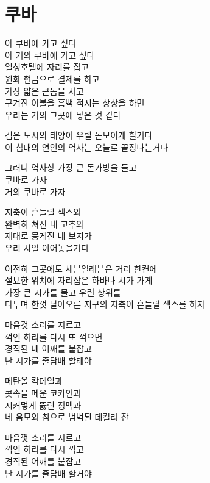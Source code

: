 \begin{article}
\hypertarget{uxcfe0uxbc14}{%
\chapter{쿠바}\label{uxcfe0uxbc14}}

아 쿠바에 가고 싶다\\
아 거의 쿠바에 가고 싶다\\
일성호텔에 자리를 잡고\\
원화 현금으로 결제를 하고\\
가장 얇은 콘돔을 사고\\
구겨진 이불을 흠뻑 적시는 상상을 하면\\
우리는 거의 그곳에 닿은 것 같다

검은 도시의 태양이 우릴 돋보이게 할거다\\
이 침대의 연인의 역사는 오늘로 끝장나는거다

그러니 역사상 가장 큰 돈가방을 들고\\
쿠바로 가자\\
거의 쿠바로 가자

지축이 흔들릴 섹스와\\
완벽히 쳐진 내 고추와\\
제대로 뭉게진 네 보지가\\
우리 사일 이어놓을거다

여전히 그곳에도 세븐일레븐은 거리 한켠에\\
절묘한 위치에 자리잡은 하바나 시가 가게\\
가장 큰 시가를 물고 우린 상위를\\
다투며 한껏 달아오른 지구의 지축이 흔들릴 섹스를 하자

마음것 소리를 지르고\\
꺽인 허리를 다시 또 꺽으면\\
경직된 네 어깨를 붙잡고\\
난 시가를 줄담배 할테야

메탄올 칵테일과\\
콧속을 메운 코카인과\\
시커멓게 뚫린 정맥과\\
네 음모와 침으로 범벅된 데킬라 잔

마음껏 소리를 지르고\\
꺽인 허리를 다시 꺽고\\
경직된 어깨를 붙잡고\\
난 시가를 줄담배 할거야
\end{article}

